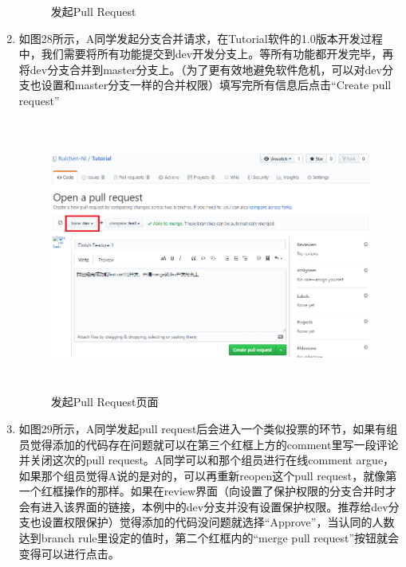 \documentclass[a4paper,14pt]{article}
\begin{document}
\begin{enumerate}[1. ]
\begin{figure}[h]
\caption{发起Pull Request}
\end{figure}
\newpage
\item 如图28所示，A同学发起分支合并请求，在Tutorial软件的1.0版本开发过程中，我们需要将所有功能提交到dev开发分支上。等所有功能都开发完毕，再将dev分支合并到master分支上。（为了更有效地避免软件危机，可以对dev分支也设置和master分支一样的合并权限）填写完所有信息后点击“Create pull request”

\begin{figure}[h]
\centering
\includegraphics[height=9cm]{figure/step10}
\caption{发起Pull Request页面}
\end{figure}

\newpage
\item 如图29所示，A同学发起pull request后会进入一个类似投票的环节，如果有组员觉得添加的代码存在问题就可以在第三个红框上方的comment里写一段评论并关闭这次的pull request。A同学可以和那个组员进行在线comment argue，如果那个组员觉得A说的是对的，可以再重新reopen这个pull request，就像第一个红框操作的那样。如果在review界面（向设置了保护权限的分支合并时才会有进入该界面的链接，本例中的dev分支并没有设置保护权限。推荐给dev分支也设置权限保护）觉得添加的代码没问题就选择“Approve”，当认同的人数达到branch rule里设定的值时，第二个红框内的“merge pull request”按钮就会变得可以进行点击。


\end{enumerate}
\end{document}

